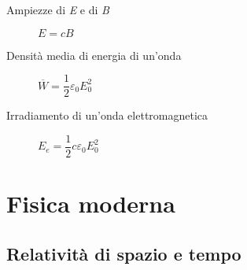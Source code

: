 \documentclass[a4paper,11pt,italian]{article}
\begin{document}
\begin{description}
    \item[Ampiezze di \textit{E} e di \textit{B}] $ E = cB $
  
  \item[Densità media di energia di un'onda] 
  $ \overline{W} = \dfrac{1}{2} \varepsilon_0 E_0^2 $
  
  \item[Irradiamento di un'onda elettromagnetica]
  $ E_e = \dfrac{1}{2} c \varepsilon_0 E_0^2 $
\end{description}


\newpage
\section{Fisica moderna}

\subsection{Relatività di spazio e tempo}
\end{document}
